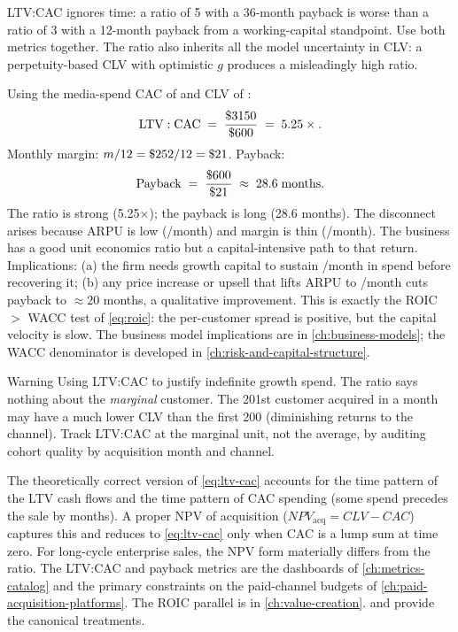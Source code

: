 LTV:CAC ignores time: a ratio of 5 with a 36-month payback is worse than a ratio of 3 with a 12-month payback from a working-capital standpoint. Use both metrics together. The ratio also inherits all the model uncertainty in CLV: a perpetuity-based CLV with optimistic \(g\) produces a misleadingly high ratio.

\begin{example}
Using the media-spend CAC of  and CLV of :
\[
  \mathrm{LTV:CAC} \;=\; \frac{\$\num{3150}}{\$\num{600}} \;=\; 5.25\times .
\]
Monthly margin: \(m/12 = \$\num{252}/12 = \$\num{21}\). Payback:
\[
  \mathrm{Payback} \;=\; \frac{\$\num{600}}{\$\num{21}} \;\approx\; 28.6 \;\text{months}.
\]
The ratio is strong (5.25×); the payback is long (28.6 months). The disconnect arises because ARPU is low (/month) and margin is thin (/month). The business has a good unit economics ratio but a capital-intensive path to that return. Implications: (a) the firm needs growth capital to sustain /month in spend before recovering it; (b) any price increase or upsell that lifts ARPU to /month cuts payback to \(\approx 20\) months, a qualitative improvement. This is exactly the ROIC \(>\) WACC test of \cref{eq:roic}: the per-customer spread is positive, but the capital velocity is slow. The business model implications are in \cref{ch:business-models}; the WACC denominator is developed in \cref{ch:risk-and-capital-structure}.
\end{example}

\begin{admonition}{Warning}
Using LTV:CAC to justify indefinite growth spend. The ratio says nothing about the \emph{marginal} customer. The 201st customer acquired in a month may have a much lower CLV than the first 200 (diminishing returns to the channel). Track LTV:CAC at the marginal unit, not the average, by auditing cohort quality by acquisition month and channel.
\end{admonition}

The theoretically correct version of \cref{eq:ltv-cac} accounts for the time pattern of the LTV cash flows and the time pattern of CAC spending (some spend precedes the sale by months). A proper NPV of acquisition (\(NPV_{\text{acq}} = CLV - CAC\)) captures this and reduces to \cref{eq:ltv-cac} only when CAC is a lump sum at time zero. For long-cycle enterprise sales, the NPV form materially differs from the ratio. The LTV:CAC and payback metrics are the dashboards of \cref{ch:metrics-catalog} and the primary constraints on the paid-channel budgets of \cref{ch:paid-acquisition-platforms}. The ROIC parallel is in \cref{ch:value-creation}. \textcite{gupta2004customer} and \textcite{bendle2020marketing} provide the canonical treatments.

